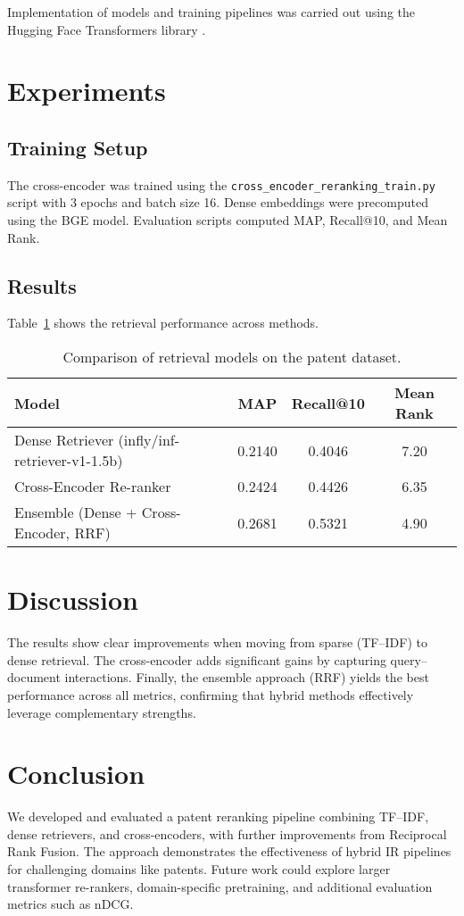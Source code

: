 \documentclass[11pt,a4paper]{article}
\begin{document}
Implementation of models and training pipelines was carried out using the Hugging Face Transformers library \cite{wolf2020transformers}.

\section{Experiments}
\subsection{Training Setup}
The cross-encoder was trained using the \texttt{cross\_encoder\_reranking\_train.py} script with 3 epochs and batch size 16. Dense embeddings were precomputed using the BGE model. Evaluation scripts computed MAP, Recall@10, and Mean Rank.

\subsection{Results}
Table~\ref{tab:results} shows the retrieval performance across methods.

\begin{table}[H]
\centering
\begin{tabular}{lccc}
\toprule
\textbf{Model} & \textbf{MAP} & \textbf{Recall@10} & \textbf{Mean Rank} \\
\midrule
Dense Retriever (infly/inf-retriever-v1-1.5b) & 0.2140 & 0.4046 & 7.20 \\
Cross-Encoder Re-ranker & 0.2424 & 0.4426 & 6.35 \\
Ensemble (Dense + Cross-Encoder, RRF) & 0.2681 & 0.5321 & 4.90 \\
\bottomrule
\end{tabular}
\caption{Comparison of retrieval models on the patent dataset.}
\label{tab:results}
\end{table}

\FloatBarrier

\section{Discussion}
The results show clear improvements when moving from sparse (TF--IDF) to dense retrieval. The cross-encoder adds significant gains by capturing query--document interactions. Finally, the ensemble approach (RRF) yields the best performance across all metrics, confirming that hybrid methods effectively leverage complementary strengths.

\section{Conclusion}
We developed and evaluated a patent reranking pipeline combining TF--IDF, dense retrievers, and cross-encoders, with further improvements from Reciprocal Rank Fusion. The approach demonstrates the effectiveness of hybrid IR pipelines for challenging domains like patents. Future work could explore larger transformer re-rankers, domain-specific pretraining, and additional evaluation metrics such as nDCG.



\end{document}
